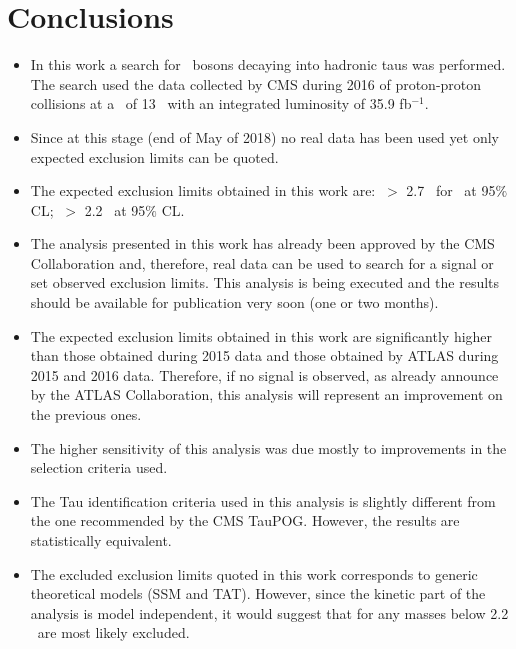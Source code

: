\section{Conclusions}

\begin{itemize}
 \item In this work a search for \Zprime~bosons decaying into hadronic taus was performed. The search used 
 the data collected by CMS during 2016 of proton-proton collisions at a \centermassenergy~of 13 \TeV~with an 
 integrated luminosity of 35.9 fb$^{-1}$.
 \item Since at this stage (end of May of 2018) no real data has been used yet only expected 
 exclusion limits can be quoted.
 \item The expected exclusion limits obtained in this work are: \mass $~>$ 2.7 \TeV~for \ZprimeSSM~at 95$\%$ CL;
 \mass $~>$ 2.2 \ZprimeTAT~at 95$\%$ CL.
 \item The analysis presented in this work has already been approved by the CMS Collaboration and, therefore, 
 real data can be used to search for a signal or set observed exclusion limits. This analysis is being executed
 and the results should be available for publication very soon (one or two months).
 \item The expected exclusion limits obtained in this work are significantly higher than those 
 obtained during 2015 data and those obtained by ATLAS during 2015 and 2016 data. Therefore, 
 if no signal is observed, as already announce by the ATLAS Collaboration, this analysis will 
 represent an improvement on the previous ones.
 \item The higher sensitivity of this analysis was due mostly to improvements in the selection criteria used.
 \item The Tau identification criteria used in this analysis is slightly different from the one 
 recommended by the CMS TauPOG. However, the results are statistically equivalent.
 \item The excluded exclusion limits quoted in this work corresponds to generic theoretical models (SSM and TAT). However,
 since the kinetic part of the analysis is model independent, it would suggest that for any \Zprime masses below 
 2.2 \TeV~are most likely excluded.
 \end{itemize}
% 


%  
% 
% 
% 
% 
